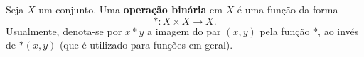 \begin{definition}
	Seja $X$ um conjunto. Uma \textbf{operação binária} em $X$ é uma função da forma
	\[\ast\colon X\times X\to X.\]
	Usualmente, denota-se por $x\ast y$ a imagem do par $(x,y)$ pela função $\ast$, ao invés de $\ast(x,y)$ (que é utilizado para funções em geral).
\end{definition}